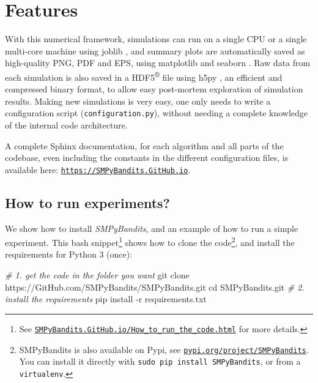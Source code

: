 \documentclass[a4paper,10pt,]{article}
\newenvironment{Shaded}{}{}
\newcommand{\BuiltInTok}[1]{#1}
\newcommand{\CommentTok}[1]{\textcolor[rgb]{0.38,0.63,0.69}{\textit{#1}}}
\newcommand{\ExtensionTok}[1]{#1}
\newcommand{\FunctionTok}[1]{\textcolor[rgb]{0.02,0.16,0.49}{#1}}
\newcommand{\NormalTok}[1]{#1}
\begin{document}
\section{Features}\label{features}

With this numerical framework, simulations can run on a single CPU or a
single multi-core machine using joblib \citep{joblib}, and summary plots are
automatically saved as high-quality PNG, PDF and EPS, using matplotlib \citep{matplotlib} and seaborn \citep{seaborn}.
Raw data from each simulation is also saved in a HDF5\textsuperscript{®} file using h5py \citep{h5py}, an efficient and compressed binary format, to allow easy post-mortem exploration of simulation results.
Making new simulations is very easy, one only
needs to write a configuration script (\texttt{configuration.py}), without needing a complete knowledge of the internal code architecture.

A complete Sphinx documentation, for each algorithm and all parts of the codebase, even including the constants in the different configuration files, is available here:
\href{SMPyBandits.GitHub.io/}{\texttt{https://SMPyBandits.GitHub.io}}.

\subsection{How to run experiments?}\label{how-to-run-the-experiments}

We show how to install \emph{SMPyBandits}, and an example of how to run
a simple experiment. This bash snippet\footnote{See
\href{https://SMPyBandits.GitHub.io/How_to_run_the_code.html}{\texttt{SMPyBandits.GitHub.io/How\_to\_run\_the\_code.html}}
for more details.} shows how to clone the code\footnote{SMPyBandits is also available on Pypi, see
\href{https://pypi.org/project/SMPyBandits/}{\texttt{pypi.org/project/SMPyBandits}}.
You can install it directly with
\texttt{sudo\ pip\ install\ SMPyBandits}, or from a
\texttt{virtualenv}.}, and install the requirements for Python 3 (once):

\begin{Shaded}
\begin{Highlighting}[]
\CommentTok{# 1. get the code in the folder you want}
\NormalTok{\textdollar }\FunctionTok{git}\NormalTok{ clone https://GitHub.com/SMPyBandits/SMPyBandits.git}
\NormalTok{\textdollar }\BuiltInTok{cd}\NormalTok{ SMPyBandits.git}
\CommentTok{# 2. install the requirements}
\NormalTok{\textdollar }\ExtensionTok{pip}\NormalTok{ install -r requirements.txt}
\end{Highlighting}
\end{Shaded}
\end{document}
